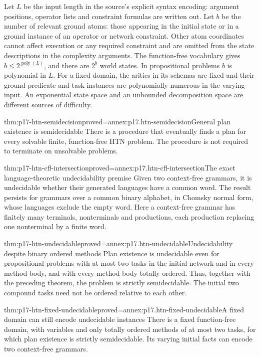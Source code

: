 Let \(L\) be the input length in the source's explicit syntax encoding:
argument positions, operator lists and constraint formulas are written out.
Let \(b\) be the number of relevant ground atoms: those appearing in the
initial state or in a ground instance of an operator or network constraint.
Other atom coordinates cannot affect execution or any required constraint
and are omitted from the state descriptions in the complexity arguments.
The function-free vocabulary gives \(b\leq2^{\operatorname{poly}(L)}\), and
there are \(2^b\) world states. In propositional problems \(b\) is polynomial
in \(L\). For a fixed domain, the arities in its schemas are fixed and their
ground predicate and task instances are polynomially numerous in the varying
input. An exponential state space and
an unbounded decomposition space are different sources of difficulty.

\begin{hbtheorem}{thm:p17-htn-semidecision}{proved=annex:p17.htn-semidecision}{General plan existence is semidecidable}
There is a procedure that eventually finds a plan for every solvable finite,
function-free HTN problem. The procedure is not required to terminate on
unsolvable problems.
\end{hbtheorem}

\begin{hblemma}{thm:p17-htn-cfl-intersection}{proved=annex:p17.htn-cfl-intersection}{The exact language-theoretic undecidability premise}
Given two context-free grammars, it is undecidable whether their generated
languages have a common word. The result persists for grammars over a common
binary alphabet, in Chomsky normal form, whose languages exclude the empty
word. Here a context-free grammar has finitely many terminals, nonterminals
and productions, each production replacing one nonterminal by a finite word.
\end{hblemma}

\begin{hbtheorem}{thm:p17-htn-undecidable}{proved=annex:p17.htn-undecidable}{Undecidability despite binary ordered methods}
Plan existence is undecidable even for propositional problems with at most
two tasks in the initial network and in every method body, and with every
method body totally ordered. Thus, together with the preceding theorem, the
problem is strictly semidecidable. The initial two compound tasks need not be
ordered relative to each other.
\end{hbtheorem}

\begin{hbtheorem}{thm:p17-htn-fixed-undecidable}{proved=annex:p17.htn-fixed-undecidable}{A fixed domain can still encode undecidable instances}
There is a fixed function-free domain, with variables and only totally ordered
methods of at most two tasks, for which plan existence is strictly
semidecidable. Its varying initial facts can encode two context-free grammars.
\end{hbtheorem}

